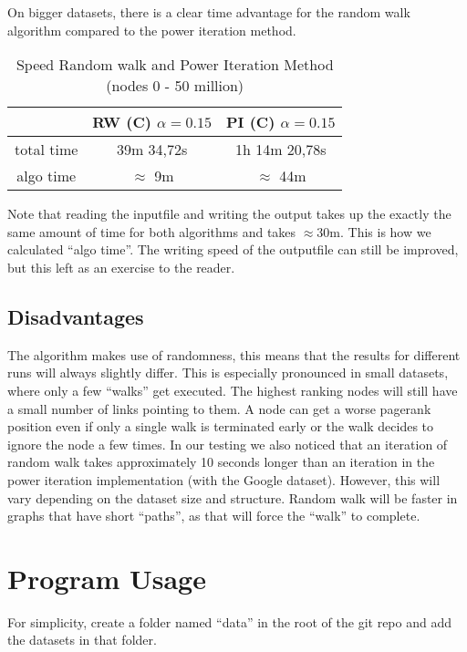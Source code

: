 \documentclass{article}
\begin{document}
On bigger datasets, there is a clear time advantage for the random walk algorithm compared to the power iteration method. 
\begin{table}[H]
    \centering
    \begin{tabular}{|c|c|c|}
        \hline
        & RW (C) $\alpha = 0.15$ & PI (C) $\alpha = 0.15$ \\ \hline
        total time & 39m 34,72s & 1h 14m 20,78s \\ \hline
        algo time & $\approx$ 9m  & $\approx$ 44m \\ \hline

    \end{tabular}
    \caption{Speed Random walk and Power Iteration Method (nodes 0 - 50 million)}
    \label{tab:random-timing}
\end{table}
Note that reading the inputfile and writing the output takes up the exactly the same amount of time for both algorithms and takes $\approx 30$m. This is how we calculated ``algo time''. The writing speed of the outputfile can still be improved, but this left as an exercise to the reader.

\subsection{Disadvantages}
The algorithm makes use of randomness, this means that the results for different runs will always slightly differ. This is especially pronounced in small datasets, where only a few ``walks'' get executed. The highest ranking nodes will still have a small number of links pointing to them. A node can get a worse pagerank position even if only a single walk is terminated early or the walk decides to ignore the node a few times. 
In our testing we also noticed that an iteration of random walk takes approximately 10 seconds longer than an iteration in the power iteration implementation (with the Google dataset). However, this will vary depending on the dataset size and structure. Random walk will be faster in graphs that have short ``paths'', as that will force the ``walk'' to complete.

\section{Program Usage}
For simplicity, create a folder named ``data'' in the root of the git repo and add the datasets in that folder. 
\end{document}
